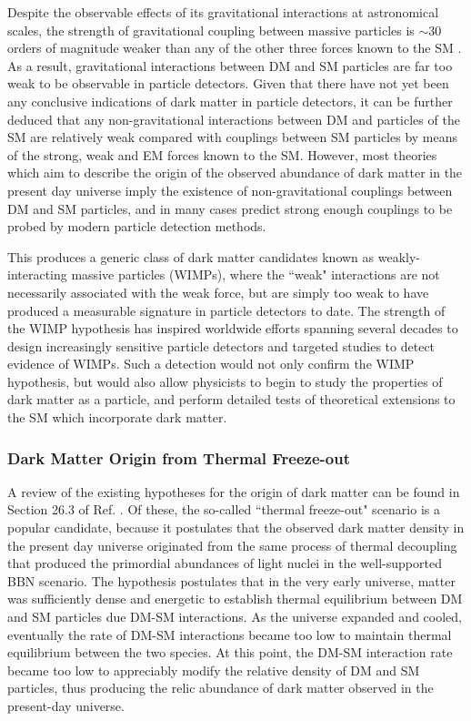 Despite the observable effects of its gravitational interactions at astronomical scales, the strength of gravitational coupling between massive particles is \(\sim30\) orders of magnitude weaker than any of the other three forces known to the SM \cite{griffiths_2008}. As a result, gravitational interactions between DM and SM particles are far too weak to be observable in particle detectors. Given that there have not yet been any conclusive indications of dark matter in particle detectors, it can be further deduced that any non-gravitational interactions between DM and particles of the SM are relatively weak compared with couplings between SM particles by means of the strong, weak and EM forces known to the SM. However, most theories which aim to describe the origin of the observed abundance of dark matter in the present day universe imply the existence of non-gravitational couplings between DM and SM particles, and in many cases predict strong enough couplings to be probed by modern particle detection methods. 

This produces a generic class of dark matter candidates known as weakly-interacting massive particles (WIMPs), where the ``weak" interactions are not necessarily associated with the weak force, but are simply too weak to have produced a measurable signature in particle detectors to date. The strength of the WIMP hypothesis has inspired worldwide efforts spanning several decades to design increasingly sensitive particle detectors and targeted studies to detect evidence of WIMPs. Such a detection would not only confirm the WIMP hypothesis, but would also allow physicists to begin to study the properties of dark matter as a particle, and perform detailed tests of theoretical extensions to the SM which incorporate dark matter.

\subsubsection{Dark Matter Origin from Thermal Freeze-out}

A review of the existing hypotheses for the origin of dark matter can be found in Section 26.3 of Ref. \cite{pdg_2018}. Of these, the so-called ``thermal freeze-out" scenario is a popular candidate, because it postulates that the observed dark matter density in the present day universe originated from the same process of thermal decoupling that produced the primordial abundances of light nuclei in the well-supported BBN scenario. The hypothesis postulates that in the very early universe, matter was sufficiently dense and energetic to establish thermal equilibrium between DM and SM particles due DM-SM interactions. As the universe expanded and cooled, eventually the rate of DM-SM interactions became too low to maintain thermal equilibrium between the two species. At this point, the DM-SM interaction rate became too low to appreciably modify the relative density of DM and SM particles, thus producing the relic abundance of dark matter observed in the present-day universe. 

